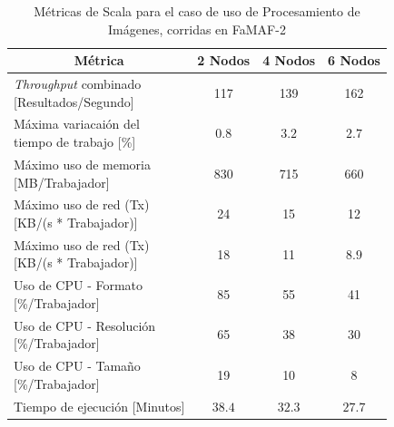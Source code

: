 \documentclass[11pt]{article}
\providecommand{\row}[1]{\parbox{150pt}{\setlength{\baselineskip}{0.2\baselineskip}\strut#1\strut}}
\newcommand{\ipcap}[2]{\caption{Métricas de #1 para el caso de uso de Procesamiento de Imágenes, corridas en #2}}
\newcommand{\english}[1]{\textit{#1}}
\begin{document}
\begin{table}[H]
\centering
\begin{tabular}{|l|c|c|c|}
\hline
\multicolumn{1}{|c|}{Métrica} & 2 Nodos & 4 Nodos & 6 Nodos \\ \hline
\row{\english{Throughput} combinado\\{[Resultados/Segundo]}} & 117 & 139 & 162 \\ \hline
\row{Máxima variacaión del \\ tiempo de trabajo {[}\%{]}} & $0.8$ & $3.2$ & $2.7$ \\ \hline
\row{Máximo uso de memoria \\ {[MB/Trabajador]}} & 830 & 715 & 660 \\ \hline
\row{Máximo uso de red (Tx) \\ {[KB/(s * Trabajador)]}} & 24 & 15 & 12 \\ \hline
\row{Máximo uso de red (Tx) \\ {[KB/(s * Trabajador)]}} & 18 & 11 & $8.9$ \\ \hline
\row{Uso de CPU - Formato\\{[\%/Trabajador]}} & 85 & 55 & 41 \\ \hline
\row{Uso de CPU - Resolución\\{[\%/Trabajador]}} & 65 & 38 & 30 \\ \hline
\row{Uso de CPU - Tamaño\\{[\%/Trabajador]}} & 19 & 10 & 8 \\ \hline
Tiempo de ejecución [Minutos] & $38.4$ & $32.3$ & $27.7$ \\ \hline
\end{tabular}
\ipcap{Scala}{FaMAF-2}
\end{table}
\end{document}
